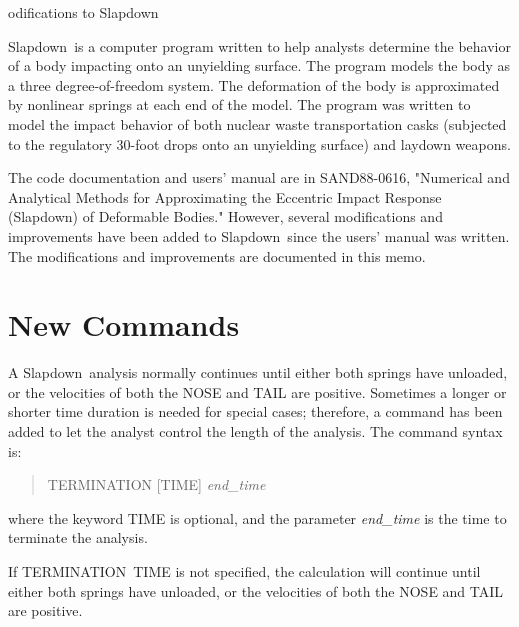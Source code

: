 \def\SLAP{{\sf Slap\-down}}
\def\slap{{\sf Slap\-down}}
\def\exo{{\sf EXODUS}}
\newcommand{\caps}[1]
   {\uppercase{#1}\null}
\newcommand{\cmd}[1]
   {\mbox{\sf\uppercase{#1}}\null}
\newcommand{\lcmd}[1]
   {\mbox{\sf#1}\null}
\newcommand{\param}[1]
   {{\em #1}\null}
\newcommand{\optparam}[1]
   {[{\em #1\/}]\null}
\newcommand{\bold}[1]
   {{\bf #1}\null}

\begin{memo}

\subject Modifications to \slap

\SLAP\ is a computer program written to help analysts determine the
behavior of a body impacting onto an unyielding surface.  The program
models the body as a three degree-of-freedom system.  The deformation of
the body is approximated by nonlinear springs at each end of the model.
The program was written to model the impact behavior of both nuclear
waste transportation casks (subjected to the regulatory 30-foot drops
onto an unyielding surface) and laydown weapons. 

The code documentation and users' manual are in SAND88-0616, "Numerical
and Analytical Methods for Approximating the Eccentric Impact Response
(Slapdown) of Deformable Bodies."  However, several modifications and
improvements have been added to \slap\ since the users' manual was
written.  The modifications and improvements are documented in this
memo. 

\section*{New Commands}

A \slap\ analysis normally continues until either both springs have
unloaded, or the velocities of both the \cmd{NOSE} and \cmd{TAIL} are
positive.  Sometimes a longer or shorter time duration is needed for
special cases; therefore, a command has been added to let the analyst
control the length of the analysis.  The command syntax is: 
\begin{quote}
\sf TERMINATION [TIME] \em end\_time
\end{quote}
where the keyword \cmd{TIME} is optional, and the parameter
\param{end\_time} is the time to terminate the analysis.  

If \cmd{TERMINATION~TIME} is not specified, the calculation will
continue until either both springs have unloaded, or the velocities of
both the \cmd{NOSE} and \cmd{TAIL} are positive. 


\end{memo}
